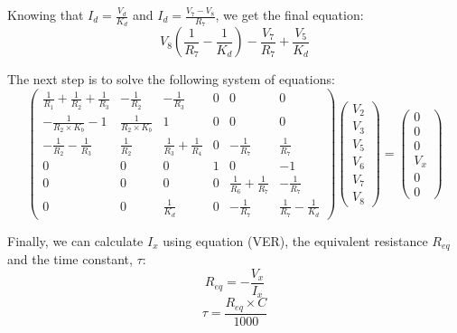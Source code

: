 Knowing that $I_d = \frac{V_d}{K_d}$ and $I_d = \frac{V_7-V_8}{R_7}$, we get the final equation:
\begin{equation}
V_8\left( \frac{1}{R_7} - \frac{1}{K_d}\right) - \frac{V_7}{R_7} + \frac{V_5}{K_d}
\end{equation}


The next step is to solve the following system of equations:
\begin{equation}
\left(\begin{array}{cccccc} \frac{1}{R_1}+\frac{1}{R_2} +\frac{1}{R_3} & -\frac{1}{R_2} & -\frac{1}{R_3} & 0 & 0 & 0\\ -\frac{1}{R_2\times K_b}-1 & \frac{1}{R_2\times K_b} & 1 & 0 & 0 & 0 \\ -\frac{1}{R_2}-\frac{1}{R_3} & \frac{1}{R_2} & \frac{1}{R_3}+\frac{1}{R_4} & 0& -\frac{1}{R_7} &\frac{1}{R_7} \\ 0&0&0&1&0&-1\\0&0&0&0&\frac{1}{R_6}+\frac{1}{R_7}&-\frac{1}{R_7} \\ 0&0&\frac{1}{K_d}&0&-\frac{1}{R_7}&\frac{1}{R_7}-\frac{1}{K_d}\end{array}\right)
\left(\begin{array}{c} V_2 \\ V_3 \\ V_5 \\ V_6 \\ V_7 \\ V_8 \end{array}\right) 
= \left(\begin{array}{c} 0 \\ 0 \\ 0 \\ V_x \\ 0 \\ 0 \end{array}\right)
\end{equation}

Finally, we can calculate $I_x$ using equation (VER), the equivalent resistance $R_{eq}$ and the time constant, $\tau$: 
\begin{equation}
R_{eq}=-\frac{V_x}{I_x}
\end{equation}
\begin{equation}
\tau=\frac{R_{eq}\times C}{1000}
\end{equation}